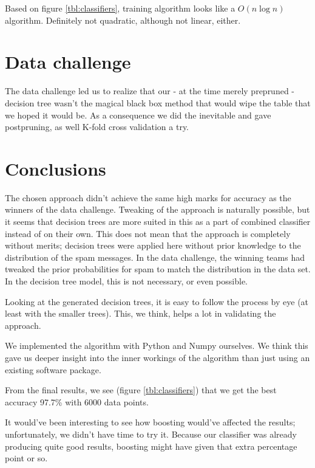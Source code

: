 \documentclass[a4paper,10pt]{article}
\begin{document}
Based on figure \ref{tbl:classifiers}, training algorithm looks like a
$O(n\log{n})$ algorithm.  Definitely not quadratic, although not linear,
either.

\section{Data challenge}


The data challenge led us to realize that our - at the time merely
prepruned - decision tree wasn't the magical black box method
that would wipe the table that we hoped it would be.
As a consequence we did the inevitable and gave postpruning,
as well K-fold cross validation a try.


\section{Conclusions}

The chosen approach didn't achieve the same high marks for accuracy as
the winners of the data challenge.  Tweaking of the approach is
naturally possible, but it seems that decision trees are more suited in
this as a part of combined classifier instead of on their own.  This
does not mean that the approach is completely without merits; decision
trees were applied here without prior knowledge to the distribution of
the spam messages.  In the data challenge, the winning teams had tweaked
the prior probabilities for spam to match the distribution in the data
set.  In the decision tree model, this is not necessary, or even
possible.

Looking at the generated decision trees, it is easy to follow the
process by eye (at least with the smaller trees).  This, we think, helps
a lot in validating the approach.

We implemented the algorithm with Python and Numpy ourselves.  We think
this gave us deeper insight into the inner workings of the algorithm
than just using an existing software package.

From the final results, we see (figure \ref{tbl:classifiers}) that we
get the best accuracy 97.7\% with 6000 data points.

It would've been interesting to see how
boosting\cite[p. 360]{alpaydin2004} would've affected the results;
unfortunately, we didn't have time to try it.  Because our classifier
was already producing quite good results, boosting might have given that
extra percentage point or so.
\end{document}
